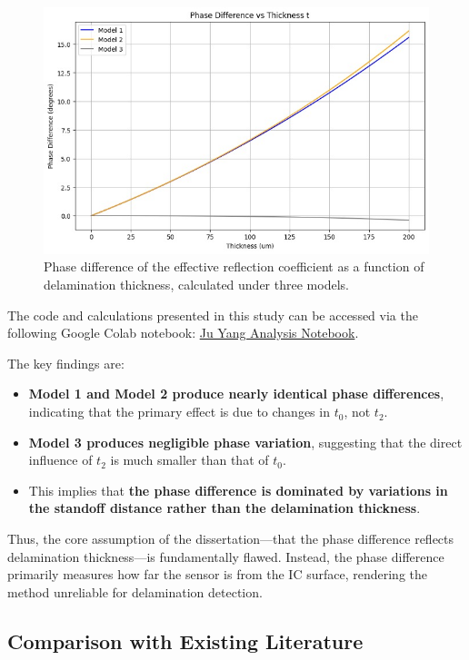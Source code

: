 \documentclass[10pt,twocolumn]{article}
\begin{document}
\begin{figure}[ht]
    \centering
    \includegraphics[width=0.8\linewidth]{Fig2.jpg}
    \caption{Phase difference of the effective reflection coefficient as a function of delamination thickness, calculated under three models.}
    \label{fig:phase_difference}
\end{figure}

The code and calculations presented in this study can be accessed via the following Google Colab notebook: \href{https://github.com/yujikaneko/QRP_Ju/blob/main/JuYang.ipynb}{Ju Yang Analysis Notebook}.

The key findings are:

\begin{itemize}
    \item \textbf{Model 1 and Model 2 produce nearly identical phase differences}, indicating that the primary effect is due to changes in \( t_0 \), not \( t_2 \).
    \item \textbf{Model 3 produces negligible phase variation}, suggesting that the direct influence of \( t_2 \) is much smaller than that of \( t_0 \).
    \item This implies that \textbf{the phase difference is dominated by variations in the standoff distance rather than the delamination thickness}.
\end{itemize}

Thus, the core assumption of the dissertation—that the phase difference reflects delamination thickness—is fundamentally flawed. Instead, the phase difference primarily measures how far the sensor is from the IC surface, rendering the method unreliable for delamination detection.

\subsection{Comparison with Existing Literature}
\end{document}
